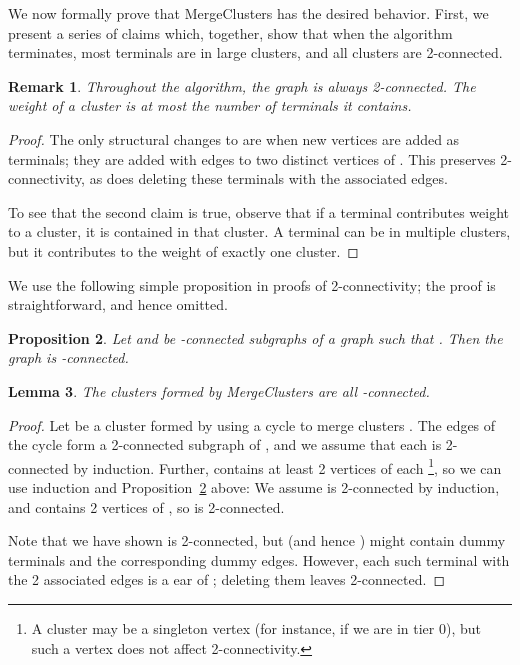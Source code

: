 \documentclass[11pt]{article}
\newtheorem{lemma}{Lemma}[section]
\newtheorem{proposition}[lemma]{Proposition}
\newtheorem{remark}[lemma]{Remark}
\begin{document}
We now formally prove that {\sc MergeClusters} has the desired
behavior. First, we present a series of claims which, together, show
that when the algorithm terminates, most terminals are in large
clusters, and all clusters are 2-connected.

\begin{remark}\label{rem:cluster}
  Throughout the algorithm, the graph  is always 2-connected. The
  weight of a cluster is at most the number of terminals it contains.
\end{remark}
\begin{proof}
  The only structural changes to  are when new vertices are added
  as terminals; they are added with edges to two distinct vertices of
  . This preserves 2-connectivity, as does deleting these terminals
  with the associated edges.

  To see that the second claim is true, observe that if a terminal
  contributes weight to a cluster, it is contained in that cluster. A
  terminal can be in multiple clusters, but it contributes to the
  weight of exactly one cluster.
\end{proof}

We use the following simple proposition in proofs of 2-connectivity;
the proof is straightforward, and hence omitted.

\begin{proposition}\label{prop:shareEdge}
  Let  and  be -connected subgraphs
  of a graph  such that .  Then the
  graph  is
  -connected.
\end{proposition}

\begin{lemma}\label{lem:clusters2conn}
The clusters formed by {\sc MergeClusters} are all -connected.
\end{lemma}
\begin{proof}
  Let  be a cluster formed by using a cycle  to merge clusters
  . The edges of the cycle  form a
  2-connected subgraph of , and we assume that each  is
  2-connected by induction.  Further,  contains at least 2 vertices
  of each \footnote{A cluster  may be a singleton vertex
    (for instance, if we are in tier 0), but such a vertex does not
    affect 2-connectivity.}, so we can use induction and
  Proposition~\ref{prop:shareEdge} above: We assume  is 2-connected by induction, and  contains 2
  vertices of , so  is
  2-connected.

  Note that we have shown  is 2-connected,
  but  (and hence ) might contain dummy terminals and the
  corresponding dummy edges. However, each such terminal with the 2
  associated edges is a ear of ; deleting them leaves 
  2-connected.
\end{proof}
\end{document}
